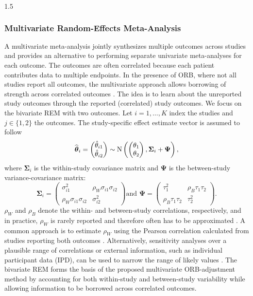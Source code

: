 \documentclass{article}
\begin{document}
\begin{spacing}{1.5}
\subsubsection{Multivariate Random-Effects Meta-Analysis}
\label{multivariate}
A multivariate meta-analysis jointly synthesizes multiple outcomes across studies and provides an alternative to performing separate univariate meta-analyses for each outcome. The outcomes are often correlated because each patient contributes data to multiple endpoints. In the presence of ORB, where not all studies report all outcomes, the multivariate approach allows borrowing of strength across correlated outcomes \cite{jackson2011multivariate, kirkham2012multivariate, schmid2020handbook}. The idea is to learn about the unreported study outcomes through the reported (correlated) study outcomes. We focus on the bivariate REM with two outcomes. Let $i = 1,\dots,K$ index the studies and $j \in \{1,2\}$ the outcomes. The study-specific effect estimate vector is assumed to follow
\begin{equation*}
\label{eq:multivariate_hetero}
\widehat{\boldsymbol{\theta}}_{i} =
\begin{pmatrix}
\hat{\theta}_{i1}\\
\hat{\theta}_{i2}
\end{pmatrix}
\sim
\operatorname{N}\left(
\begin{pmatrix}
\theta_1\\
\theta_2
\end{pmatrix},
\boldsymbol{\Sigma}_i+\boldsymbol{\Psi}
\right),
\end{equation*}
where $\boldsymbol{\Sigma}_i$ is the within-study covariance matrix and $\boldsymbol{\Psi}$ is the between-study variance-covariance matrix:
\begin{equation*}
\boldsymbol{\Sigma}_i=
\begin{pmatrix}
\sigma_{i1}^2 & \rho_W \sigma_{i1}\sigma_{i2}\\
\rho_W \sigma_{i1}\sigma_{i2} & \sigma_{i2}^2
\end{pmatrix} \text{and }
\boldsymbol{\Psi}=
\begin{pmatrix}
\tau_1^2 & \rho_B\tau_1\tau_2\\
\rho_B\tau_1\tau_2 & \tau_2^2
\end{pmatrix}.
\end{equation*}
$\rho_W$ and $\rho_B$ denote the within- and between-study correlations, respectively, and in practice, $\rho_W$ is rarely reported and therefore often has to be approximated \cite{riley2009multivariate, jackson2011multivariate}. A common approach is to estimate $\rho_W$ using the Pearson correlation calculated from studies reporting both outcomes \cite{kirkham2012multivariate}. Alternatively, sensitivity analyses over a plausible range of correlations or external information, such as individual participant data (IPD), can be used to narrow the range of likely values \cite{jackson2011multivariate, kirkham2012multivariate, mavridis2013practical, schmid2020handbook, riley2015multivariate}. The bivariate REM forms the basis of the proposed multivariate ORB-adjustment method by accounting for both within-study and between-study variability while allowing information to be borrowed across correlated outcomes.


\end{spacing}
\end{document}
